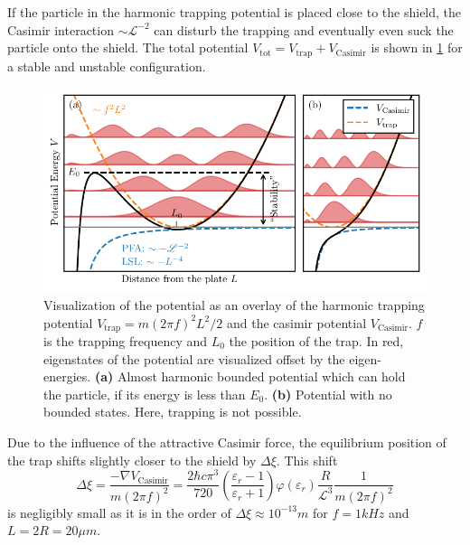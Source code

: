 If the particle in the harmonic trapping potential is placed close to the shield, the Casimir interaction $\sim \mathscr{L}^{-2}$ can disturb the trapping and eventually even suck the particle onto the shield.
The total potential $V_\mathrm{tot}=V_\mathrm{trap} + V_\mathrm{Casimir}$ is shown in \cref{fig:4:trap-eigenstates} for a stable and unstable configuration.
\begin{figure}[!htbp]
  \centering
  \includegraphics[width=\textwidth]{./../figures/others/trapping-potential-eigenstates.pdf}
  \caption{Visualization of the potential as an overlay of the harmonic trapping potential $V_\mathrm{trap} = m (2\pi f)^2 L^2 / 2$ and the casimir potential $V_\mathrm{Casimir}$. $f$ is the trapping frequency and $L_0$ the position of the trap. In red, eigenstates of the potential are visualized offset by the eigen-energies.
  \textbf{(a)} Almost harmonic bounded potential which can hold the particle, if its energy is less than $E_0$.
  \textbf{(b)} Potential with no bounded states. Here, trapping is not possible.}
  \label{fig:4:trap-eigenstates}
\end{figure}
Due to the influence of the attractive Casimir force, the equilibrium position of the trap shifts slightly closer to the shield by $\Delta \xi$. This shift
\begin{equation}
  \Delta \xi = \frac{-\nabla V_\mathrm{Casimir}}{m (2\pi f)^2} = \frac{2 \hbar c \pi^3}{720} \left(\frac{\varepsilon_r - 1}{\varepsilon_r + 1}\right) \varphi(\varepsilon_r) \frac{R}{\mathscr{L}^3} \frac{1}{m (2\pi f)^2}
\end{equation}
is negligibly small as it is in the order of $\Delta \xi \approx 10^{-13}\si{m}$ for $f=1\si{kHz}$ and $L = 2R = 20\si{\mu m}$.

